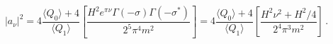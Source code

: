 \begin{equation}
\vert a_{\nu}\vert^{2}=4\frac{\langle Q_0 \rangle+4 }{\langle Q_1
\rangle}\left[ \frac{H^2 e^{\pi\nu}\Gamma(-\sigma)
\Gamma(-\sigma^{*})}{2^5\pi^4m^2}\right]=4\frac{\langle Q_0
\rangle+4 }{\langle Q_1 \rangle}\left[
\frac{H^2\nu^{2}+H^{2}/4}{2^4\pi^3m^2}\right]\,.
\end{equation}

